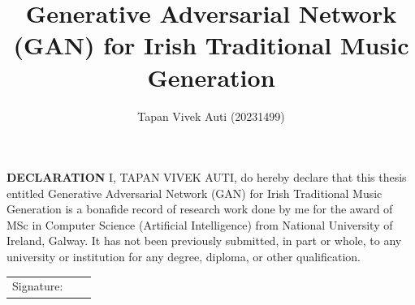 \documentclass[oneside,12pt]{Classes/RoboticsLaTeX}
\title{\Large{Generative Adversarial Network (GAN) for Irish Traditional Music Generation}}
\author{Tapan Vivek Auti (20231499)}
\begin{document}
\begin{spacing}{1}
\maketitle
\end{spacing}
\titleformat{\chapter}[display]
  {\normalfont\huge\bfseries}{\vskip-2.5em\chaptertitlename\ \thechapter}{20pt}{\Large}


\newpage\null\thispagestyle{empty}\newpage

\setcounter{secnumdepth}{3}
\setcounter{tocdepth}{3}

\frontmatter
\textbf{DECLARATION} 
I, TAPAN VIVEK AUTI, do hereby declare that this thesis entitled Generative Adversarial Network (GAN) for Irish Traditional Music Generation is a bonafide record of research work done by me for the award of MSc in Computer Science (Artificial Intelligence) from National University of Ireland, Galway. It has not been previously submitted, in part or whole, to any university or institution for any degree, diploma, or other qualification. 
\newline

\begin{tabular}{@{}p{.5in}p{4in}@{}}
Signature: & ~~\hrulefill \\
\end{tabular}
\newpage


%
%
\end{document}
